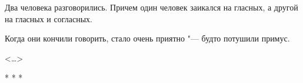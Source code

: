 
Два человека разговорились. Причем один человек заикался на гласных, а другой на гласных и согласных.

Когда они кончили говорить, стало очень приятно "--- будто потушили примус.

\begin{flushright} <\dots> \end{flushright} 
\begin{center} * * * \end{center} 